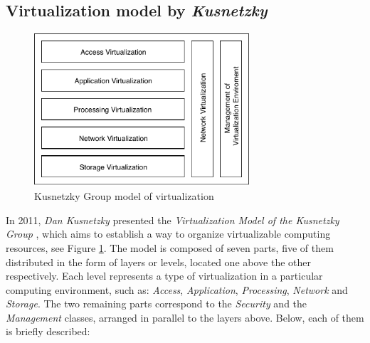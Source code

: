 	\subsection{Virtualization model by \textit{Kusnetzky}}
	
	\begin{figure}[!hbtp]
		\centering
		\includegraphics[width=8cm]{images/Kusnetzky2011.pdf}
		\vspace{-0.2cm}
		\caption{Kusnetzky Group model of virtualization\footnotemark[7]{}}
		\label{fig:kusnetzkyGroupModelOfVirtualization}
	\end{figure}
	
	
	In 2011, \textit{Dan Kusnetzky} presented the \textit{Virtualization Model of the Kusnetzky Group} \cite{Kusnetzky2011}, which aims to establish a way to organize  virtualizable computing resources, see Figure \ref{fig:kusnetzkyGroupModelOfVirtualization}. The model is composed of seven parts, five of them distributed in the form of layers or levels, located one above the other respectively. Each level represents a type of virtualization in a particular computing environment, such as: \textit{Access}, \textit{Application}, \textit{Processing}, \textit{Network} and \textit{Storage}. The two remaining parts correspond to the \textit{Security} and the \textit{Management} classes, arranged in parallel to the layers above. Below, each of them is briefly described:
	
		
		
